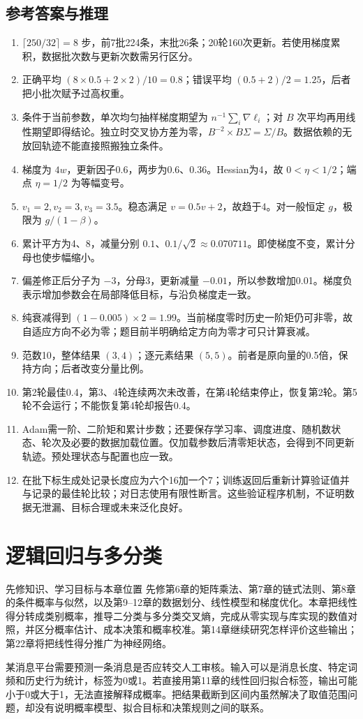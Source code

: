 \documentclass[UTF8,fontset=none,zihao=-4,a4paper]{ctexart}
\newcommand{\chapterpage}[1]{\clearpage\section{#1}}
\numberwithin{equation}{section}
\numberwithin{figure}{section}
\begin{document}
\subsection{参考答案与推理}
\begin{enumerate}[label=12.\arabic*,before={\interlinepenalty=10000}]
\item $\lceil250/32\rceil=8$ 步，前7批224条，末批26条；20轮160次更新。若使用梯度累积，数据批次数与更新次数需另行区分。
\item 正确平均 $(8\times0.5+2\times2)/10=0.8$；错误平均 $(0.5+2)/2=1.25$，后者把小批次赋予过高权重。
\item 条件于当前参数，单次均匀抽样梯度期望为 $n^{-1}\sum_i\nabla\ell_i$；对 $B$ 次平均再用线性期望即得结论。独立时交叉协方差为零，$B^{-2}\times B\Sigma=\Sigma/B$。数据依赖的无放回轨迹不能直接照搬独立条件。
\item 梯度为 $4w$，更新因子0.6，两步为0.6、0.36。Hessian为4，故 $0<\eta<1/2$；端点 $\eta=1/2$ 为等幅变号。
\item $v_1=2,v_2=3,v_3=3.5$。稳态满足 $v=0.5v+2$，故趋于4。对一般恒定 $g$，极限为 $g/(1-\beta)$。
\item 累计平方为4、8，减量分别 $0.1$、$0.1/\sqrt2\approx0.070711$。即使梯度不变，累计分母也使步幅缩小。
\item 偏差修正后分子为 $-3$，分母3，更新减量 $-0.01$，所以参数增加0.01。梯度负表示增加参数会在局部降低目标，与沿负梯度走一致。
\item 纯衰减得到 $(1-0.005)\times2=1.99$。当前梯度零时历史一阶矩仍可非零，故自适应方向不必为零；题目前半明确给定方向为零才可只计算衰减。
\item 范数10，整体结果 $(3,4)$；逐元素结果 $(5,5)$。前者是原向量的0.5倍，保持方向；后者改变分量比例。
\item 第2轮最佳0.4，第3、4轮连续两次未改善，在第4轮结束停止，恢复第2轮。第5轮不会运行；不能恢复第4轮却报告0.4。
\item Adam需一阶、二阶矩和累计步数；还要保存学习率、调度进度、随机数状态、轮次及必要的数据加载位置。仅加载参数后清零矩状态，会得到不同更新轨迹。预处理状态与配置也应一致。
\item 在批下标生成处记录长度应为六个16加一个7；训练返回后重新计算验证值并与记录的最佳轮比较；对日志使用有限性断言。这些验证程序机制，不证明数据无泄漏、目标合理或未来泛化良好。
\end{enumerate}

\chapterpage{逻辑回归与多分类}\label{ch:logistic}
\begin{infobox}{先修知识、学习目标与本章位置}
先修第6章的矩阵乘法、第7章的链式法则、第8章的条件概率与似然，以及第9--12章的数据划分、线性模型和梯度优化。本章把线性得分转成类别概率，推导二分类与多分类交叉熵，完成从零实现与库实现的数值对照，并区分概率估计、成本决策和概率校准。第14章继续研究怎样评价这些输出；第22章将把线性得分推广为神经网络。
\end{infobox}
某消息平台需要预测一条消息是否应转交人工审核。输入可以是消息长度、特定词频和历史行为统计，标签为0或1。若直接用第11章的线性回归拟合标签，输出可能小于0或大于1，无法直接解释成概率。把结果截断到区间内虽然解决了取值范围问题，却没有说明概率模型、拟合目标和决策规则之间的联系。
\end{document}
